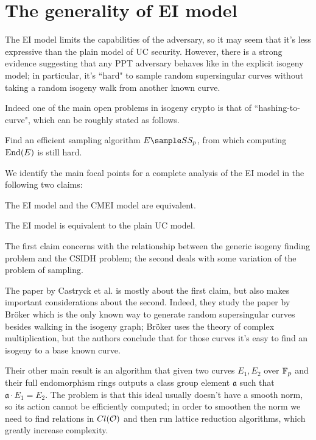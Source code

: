 \section{The generality of EI model}\label{section_EIgeneral}

The EI model limits the capabilities of the adversary, so it may seem that it's less expressive than the plain model of UC security. However, there is a strong evidence suggesting that any PPT adversary behaves like in the explicit isogeny model; in particular, it's ``hard" to sample random supersingular curves without taking a random isogeny walk from another known curve.

Indeed one of the main open problems in isogeny crypto is that of ``hashing-to-curve", which can be roughly stated as follows.
\begin{problem}[Informal]\label{problem_sampling}
    Find an efficient sampling algorithm $E\sample SS_p$, from which computing $\operatorname{End}(E)$ is still hard.
\end{problem}

We identify the main focal points for a complete analysis of the EI model in the following two claims:

\begin{claim}\label{claim_CMEI}
    The EI model and the CMEI model are equivalent.
\end{claim}

\begin{claim}\label{claim_EIUC}
    The EI model is equivalent to the plain UC model.
\end{claim}

The first claim concerns with the relationship between the generic isogeny finding problem and the CSIDH problem; the second deals with some variation of the problem of sampling.

The paper by Castryck et al. \cite{CSIDH_EndRing} is mostly about the first claim, but also makes important considerations about the second. Indeed, they study the paper by Br{\"o}ker \cite{Broker} which is the only known way to generate random supersingular curves besides walking in the isogeny graph; Br{\"o}ker uses the theory of complex multiplication, but the authors conclude that for those curves it's easy to find an isogeny to a base known curve.

Their other main result is an algorithm that given two curves $E_1,E_2$ over $\mathbb{F}_p$ and their full endomorphism rings outputs a class group element $\mathfrak{a}$ such that $\mathfrak{a}\cdot E_1=E_2$. The problem is that this ideal usually doesn't have a smooth norm, so its action cannot be efficiently computed; in order to smoothen the norm we need to find relations in $Cl(\mathcal{O})$ and then run lattice reduction algorithms, which greatly increase complexity.

